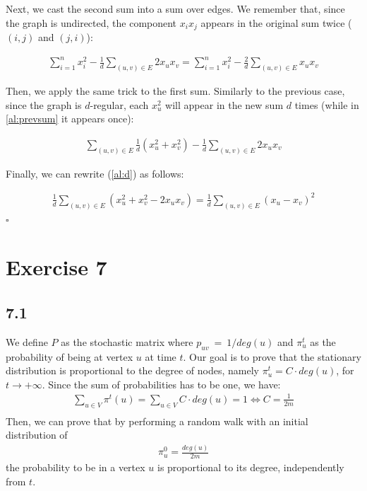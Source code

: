 \documentclass[12pt,a4paper]{article}
\newcommand*{\QEDB}{\hfill\ensuremath{\square}}%
\begin{document}
Next, we cast the second sum into a sum over edges. We remember that, since the graph is undirected, the component $x_i x_j$ appears in the original sum twice ($(i, j)$ and $(j, i)$):

\begin{align}\label{al:prevsum}
\sum_{i = 1}^n {x^2_i} - \frac{1}{d} \sum_{(u, v) \in E} 2 x_u x_v = \sum_{i = 1}^n {x^2_i} - \frac{2}{d} \sum_{(u, v) \in E} x_u x_v
\end{align}

Then, we apply the same trick to the first sum. Similarly to the previous case, since the graph is $d$-regular, each $x_u^2$ will appear in the new sum $d$ times (while in \eqref{al:prevsum} it appears once):

\begin{align}\label{al:d}
\sum_{(u, v) \in E} \frac{1}{d}(x_u^2 + x_v^2) - \frac{1}{d} \sum_{(u, v) \in E} 2 x_u x_v
\end{align}

Finally, we can rewrite (\ref{al:d}) as follows:

\begin{align}
\frac{1}{d}\sum_{(u, v) \in E} (x_u^2 + x_v^2 - 2 x_u x_v) = \frac{1}{d}\sum_{(u, v) \in E} (x_u - x_v)^2  
\end{align}
\QEDB



\section*{Exercise 7}

\subsection*{7.1}

We define $P$ as the stochastic matrix where $p_{uv}~=~1/deg(u)$ and $\pi_u^t$ as the probability of being at vertex $u$ at time $t$. Our goal is to prove that the stationary distribution is proportional to the degree of nodes, namely $\pi_u^t = C \cdot deg(u)$, for $t \rightarrow +\infty$. Since the sum of probabilities has to be one, we have:
\begin{align}
\sum_{u \in V} \pi^t(u) = \sum_{u \in V} C \cdot deg(u) = 1 \iff C = \frac{1}{2m}\\
\end{align}
Then, we can prove that by performing a random walk with an initial distribution of
\begin{align} \label{al:unif}
\pi_u^0 = \frac{deg(u)}{2m}
\end{align}
 the probability to be in a vertex $u$ is proportional to its degree, independently from $t$.
 
\end{document}
